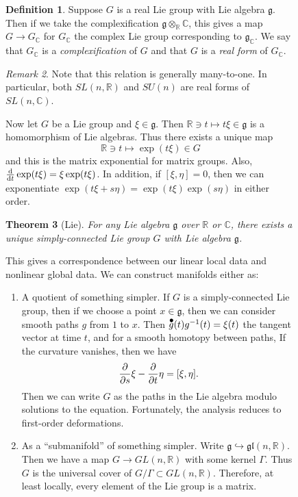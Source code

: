 \documentclass[leqno, openany]{memoir}
\newtheorem{thm}{Theorem}[section]
\theoremstyle{definition}
\newtheorem{defn}[thm]{Definition}
\theoremstyle{remark}
\newtheorem{rmk}[thm]{Remark}
\theoremstyle{plain}
\theoremstyle{definition}
\theoremstyle{remark}
\newcommand{\R}{\mathbb{R}}
\newcommand{\C}{\mathbb{C}}
\newcommand*{\dt}[1]{%
   \accentset{\mbox{\Huge\bfseries .}}{#1}}
\newcommand{\mf}[1]{\mathfrak{#1}}
\begin{document}
\begin{figure}[H]
\begin{defn} Suppose $G$ is a real Lie group with Lie algebra $\mf{g}$. Then if
    we take the complexification $\mf{g} \otimes_{\R} \C$, this gives a map $G
    \to G_{\C}$ for $G_{\C}$ the complex Lie group corresponding to
    $\mf{g}_{\C}$. We say that $G_{\C}$ is a \textit{complexification} of $G$
    and that $G$ is a \textit{real form} of $G_{\C}$.  \end{defn}

\begin{rmk} Note that this relation is generally many-to-one. In particular,
both $SL(n, \R)$ and $SU(n)$ are real forms of $SL(n, \C)$.  \end{rmk}

Now let $G$ be a Lie group and $\xi \in \mf{g}$. Then $\R \ni t \mapsto t \xi
\in \mf{g}$ is a homomorphism of Lie algebras. Thus there exists a unique map
\[ \R \ni t \mapsto \exp(t \xi) \in G \] and this is the matrix exponential for
matrix groups. Also, $\dv{t} \exp(t \xi) = \xi \exp(t \xi)$. In addition, if
$[\xi, \eta] = 0$, then we can exponentiate $\exp(t \xi + s \eta) = \exp(t \xi)
\exp(s \eta)$ in either order.

\begin{thm}[Lie] For any Lie algebra $\mf{g}$ over $\R$ or $\C$, there exists a
unique simply-connected Lie group $G$ with Lie algebra $\mf{g}$.  \end{thm}

This gives a correspondence between our linear local data and nonlinear global
data. We can construct manifolds either as: \begin{enumerate} \item A quotient
    of something simpler. If $G$ is a simply-connected Lie group, then if we
    choose a point $x \in \mf{g}$, then we can consider smooth paths $g$ from
    $1$ to $x$. Then $\dt{g}(t) g^{-1}(t) = \xi(t)$ the tangent vector at time
    $t$, and for a smooth homotopy between paths, If the curvature vanishes,
    then we have \[ \pdv{s} \xi - \pdv{t} \eta = [\xi, \eta]. \] Then we can
    write $G$ as the paths in the Lie algebra modulo solutions to the equation.
    Fortunately, the analysis reduces to first-order deformations.  \item As a
    ``submanifold'' of something simpler. Write $\mf{g} \hookrightarrow
    \mf{gl}(n, \R)$. Then we have a map $G \to GL(n, \R)$ with some kernel
    $\Gamma$. Thus $G$ is the universal cover of $G/\Gamma \subset GL(n, \R)$.
    Therefore, at least locally, every element of the Lie group is a matrix.


\end{enumerate}
\end{figure}
\end{document}

